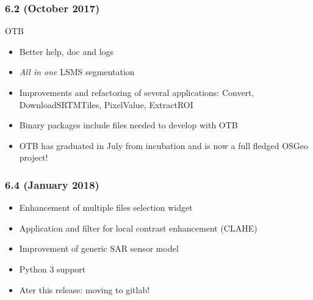 \documentclass[8pt]{beamer}
\begin{document}
\begin{frame}
  \frametitle{6.2 (October 2017)}
  \begin{block}{OTB}
    \begin{itemize}
      \item Better help, doc and logs
      \item \textit{All in one} LSMS segmentation
      \item Improvements and refactoring of several applications: Convert, DownloadSRTMTiles, PixelValue, ExtractROI
      \item Binary packages include files needed to develop with OTB
      \item OTB has graduated in July from incubation and is now a full fledged OSGeo project!
    \end{itemize}
    \end{block}
\end{frame}

\begin{frame}
  \frametitle{6.4 (January 2018)}

  \begin{itemize}
  \item Enhancement of multiple files selection widget
  \item Application and filter for local contrast enhancement (CLAHE)
  \item Improvement of generic SAR sensor model
  \item Python 3 support
  \item Ater this release: moving to gitlab!
  \end{itemize}  
\end{frame}
\end{document}
